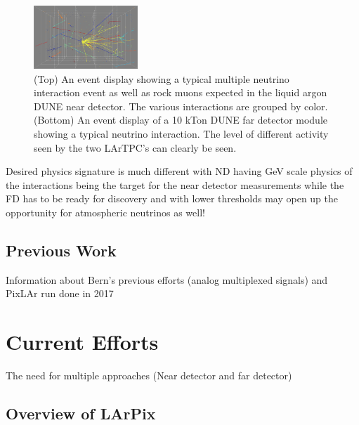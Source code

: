 \documentclass[reprint,amsmath,amssymb,aps,prl,superscriptaddress]{revtex4-1}
\begin{document}
\begin{figure}[htb]
  \begin{center}
    \includegraphics[width=0.35\textwidth]{ND.png}
    \caption{(Top) An event display showing a typical multiple neutrino interaction event as well as rock muons expected in the liquid argon DUNE near detector. The various interactions are grouped by color. (Bottom) An event display  of a 10 kTon DUNE far detector module showing a typical neutrino interaction. The level of different activity seen by the two LArTPC's can clearly be seen.\label{fig:ND-FDEvents}}
  \end{center}
\end{figure}

Desired physics signature is much different with ND having GeV scale physics of the interactions being the target for the near detector measurements while the FD has to be ready for discovery and with lower thresholds may open up the opportunity for atmospheric neutrinos as well!

\subsection{Previous Work}\label{sec:background}

Information about Bern's previous efforts (analog multiplexed signals) and PixLAr run done in 2017 

\section{Current Efforts}\label{sec:CurrentEfforts}

The need for multiple approaches (Near detector and far detector)

\subsection{Overview of LArPix}\label{sec:LArPixOverview}
\end{document}
